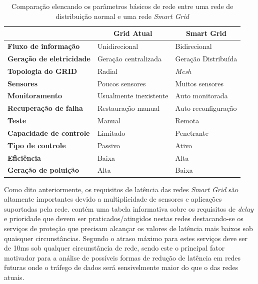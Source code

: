 \begin{table}[tbp]
\begin{tabular}{l|l|l|}
\cline{2-3}
 & \multicolumn{1}{c|}{\textbf{Grid Atual}} & \multicolumn{1}{c|}{\textbf{Smart Grid}} \\ \hline
\multicolumn{1}{|l|}{\textbf{Fluxo de informação}} & Unidirecional & Bidirecional \\ \hline
\multicolumn{1}{|l|}{\textbf{Geração de eletricidade}} & Geração centralizada & Geração Distribuída \\ \hline
\multicolumn{1}{|l|}{\textbf{Topologia do GRID}} & Radial & \emph{Mesh} \\ \hline
\multicolumn{1}{|l|}{\textbf{Sensores}} & Poucos sensores & Muitos sensores \\ \hline
\multicolumn{1}{|l|}{\textbf{Monitoramento}} & Usualmente inexistente & Auto monitorada \\ \hline
\multicolumn{1}{|l|}{\textbf{Recuperação de falha}} & Restauração manual & Auto reconfiguração \\ \hline
\multicolumn{1}{|l|}{\textbf{Teste}} & Manual & Remota \\ \hline
\multicolumn{1}{|l|}{\textbf{Capacidade de controle}} & Limitado & Penetrante \\ \hline
\multicolumn{1}{|l|}{\textbf{Tipo de controle}} & Passivo & Ativo \\ \hline
\multicolumn{1}{|l|}{\textbf{Eficiência}} & Baixa & Alta \\ \hline
\multicolumn{1}{|l|}{\textbf{Geração de poluição}} & Alta & Baixa \\ \hline
\end{tabular}
\caption[Comparação entre GRIDS normal e \emph{Smart}]{Comparação elencando os parâmetros básicos de rede entre uma rede de distribuição normal e uma rede \emph{Smart Grid}}
\label{tab_comparacao_grids}
\end{table}

Como dito anteriormente, os requisitos de latência das redes \emph{Smart Grid} são altamente importantes devido a multiplicidade de sensores e aplicações suportadas pela rede. \cite{Art-Deshpande2011} contém uma tabela informativa sobre os requisitos de \emph{delay} e prioridade que devem ser praticados/atingidos nestas redes destacando-se os serviços de proteção que precisam alcançar os valores de latência mais baixos sob quaisquer circunstâncias. Segundo \cite{Art-Deshpande2011} o atraso máximo para estes serviços deve ser de 10ms sob qualquer circunstância de rede, sendo este o principal fator motivador para a análise de possíveis formas de redução de latência em redes futuras onde o tráfego de dados será sensivelmente maior do que o das redes atuais.

